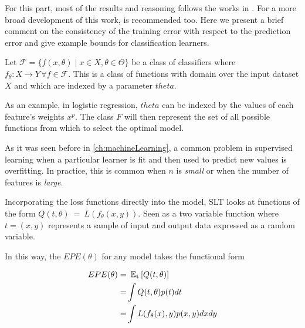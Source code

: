 For this part, most of the results and reasoning follows the works in \textcite{cherkassky-learning2007}.
For a more broad development of this work, \textcite{vapnik-nature2000} is recommended too.
Here we present a brief comment on the consistency of the training error with respect to the prediction error and give example bounds for classification learners.


Let $\mathcal {F} = \big \{ f(x,\theta) \mid x \in X, \theta \in \Theta \big \}$ be a class of classifiers where $f_\theta: X \rightarrow Y \, \forall f \in \mathcal {F}$.
This is a class of functions with domain over the input dataset $X$ and which are indexed by a parameter $theta$.

As an example, in logistic regression, $theta$ can be indexed by the values of each feature's weights $x^p$.
The class $F$ will then represent the set of all possible functions from which to select the optimal model.

As it was seen before in \cref{ch:machineLearning}, a common problem in supervised learning when a particular learner is fit and then used to predict new values is overfitting.
In practice, this is common when $n$ is \textit{small} or when the number of features is \textit{large}.

Incorporating the loss functions directly into the model, SLT looks at functions of the form $Q(t,\theta) \ = \ L(f_\theta(x,y))$.
Seen as a two variable function where $t=(x,y)$ represents a sample of input and output data expressed as a random variable.%

In this way, the $EPE(\theta)$ for any model takes the functional form


\begin{equation}
\begin{split}
EPE(\theta) = & \ \operatorname{\mathbb{E}}_{\textbf{t}} \left[ Q(t,\theta) \right]\\
= & \int Q(t,\theta) p(t) dt \\
= & \int L(f_\theta(x),y) p(x,y) dx dy
\end{split}
\end{equation}\label{eq:vapnik-risk}

